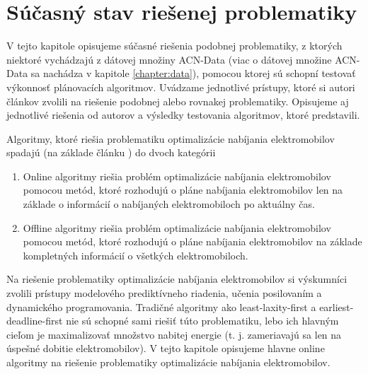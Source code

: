 


\chapter{Súčasný stav riešenej problematiky}
\label{chapter:sucasnystav}

V tejto kapitole opisujeme súčasné riešenia podobnej problematiky, z ktorých niektoré vychádzajú z dátovej množiny ACN-Data (viac o dátovej množine ACN-Data sa nachádza v kapitole \ref{chapter:data}), pomocou ktorej sú schopní testovať výkonnosť plánovacích algoritmov. Uvádzame jednotlivé prístupy, ktoré si autori článkov zvolili na riešenie podobnej alebo rovnakej problematiky. Opisujeme aj jednotlivé riešenia od autorov a výsledky testovania algoritmov, ktoré predstavili. 



Algoritmy, ktoré riešia problematiku optimalizácie nabíjania elektromobilov spadajú (na základe článku \cite{chen2021smoothed}) do dvoch kategórii
\begin{enumerate}
    \item Online algoritmy riešia problém optimalizácie nabíjania elektromobilov pomocou metód, ktoré rozhodujú o pláne nabíjania elektromobilov len na základe o informácií o nabíjaných elektromobiloch po aktuálny čas.
    \item Offline algoritmy riešia problém optimalizácie nabíjania elektromobilov pomocou metód, ktoré rozhodujú o pláne nabíjania elektromobilov na základe kompletných informácií o všetkých elektromobiloch.
\end{enumerate}
Na riešenie problematiky optimalizácie nabíjania elektromobilov si výskumníci zvolili prístupy modelového prediktívneho riadenia, učenia posilovaním a dynamického programovania. Tradičné algoritmy ako least-laxity-first a earliest-deadline-first nie sú schopné sami riešiť túto problematiku, lebo ich hlavným cieľom je maximalizovať množstvo nabitej energie (t. j. zameriavajú sa len na úspešné dobitie elektromobilov). V tejto kapitole opisujeme hlavne online algoritmy na riešenie problematiky optimalizácie nabíjania elektromobilov. \cite{lee2021adaptivephd}


